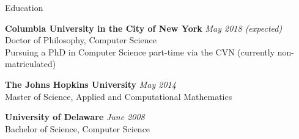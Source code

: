 \documentclass{resume} %
\begin{document}

\begin{rSection}{Education}

{\bf Columbia University in the City of New York} \hfill {\em May 2018 (expected)} \\ 
Doctor of Philosophy, Computer Science \\
Pursuing a PhD in Computer Science part-time via the CVN (currently non-matriculated)

{\bf The Johns Hopkins University} \hfill {\em May 2014} \\
Master of Science, Applied and Computational Mathematics

{\bf University of Delaware} \hfill {\em June 2008} \\
Bachelor of Science, Computer Science

\end{rSection}

\end{document}
